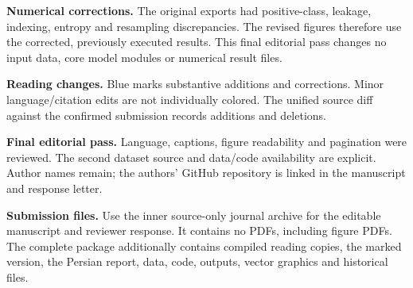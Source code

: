 \documentclass[11pt,a4paper]{article}
\begin{document}
\textbf{Numerical corrections.} The original exports had positive-class,
leakage, indexing, entropy and resampling discrepancies. The revised figures
therefore use the corrected, previously executed results. This final editorial
pass changes no input data, core model modules or numerical result files.

\textbf{Reading changes.} Blue marks substantive additions and corrections.
Minor language/citation edits are not individually colored. The unified source
diff against the confirmed submission records additions and deletions.

\textbf{Final editorial pass.} Language, captions, figure readability and
pagination were reviewed. The second dataset source and data/code availability
are explicit. Author names remain; the authors' GitHub repository is linked
in the manuscript and response letter.

\textbf{Submission files.} Use the inner source-only journal archive for the
editable manuscript and reviewer response. It contains no PDFs, including
figure PDFs. The complete package additionally contains compiled reading
copies, the marked version, the Persian report, data, code, outputs,
vector graphics and historical files.
\end{document}
